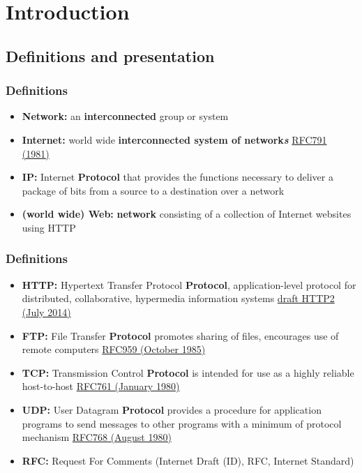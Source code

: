 \section{Introduction}
\subsection{Definitions and presentation}
  \begin{frame}
    \frametitle{Definitions}
      \begin{itemize}
        \item \textbf{Network:} an \textbf{interconnected} group or system\pause
        \item \textbf{Internet:} world wide \textbf{interconnected system of network\emph{s}} \color{blue}\href{http://tools.ietf.org/html/rfc791}{RFC791 (1981)}\color{black}\pause
        \item \textbf{IP:} Internet \textbf{Protocol} that provides the functions necessary to deliver a package of bits from a source to a destination over a network\pause
        \item \textbf{(world wide) Web:} \textbf{network} consisting of a collection of Internet websites using HTTP
      \end{itemize}
  \end{frame}
  \begin{frame}
    \frametitle{Definitions}
      \begin{itemize}
        \item \textbf{HTTP:} Hypertext Transfer Protocol \textbf{Protocol}, application-level protocol for distributed, collaborative, hypermedia information systems \color{blue}\href{http://tools.ietf.org/html/draft-ietf-httpbis-http2-14}{draft HTTP2 (July 2014)} \color{black}\pause
        \item \textbf{FTP:} File Transfer \textbf{Protocol} promotes sharing of files, encourages use of remote computers \color{blue}\href{http://tools.ietf.org/html/rfc959}{RFC959 (October 1985)} \color{black} \pause
        \item \textbf{TCP:} Transmission Control \textbf{Protocol} is intended for use as a highly reliable host-to-host \color{blue}\href{http://tools.ietf.org/html/rfc761}{RFC761 (January 1980)} \color{black} \pause
        \item \textbf{UDP:} User Datagram \textbf{Protocol} provides  a procedure  for application  programs  to send messages  to other programs  with a minimum  of protocol mechanism \color{blue}\href{http://tools.ietf.org/html/rfc768}{RFC768 (August 1980)} \color{black} \pause
        \item \textbf{RFC:} Request For Comments (Internet Draft (ID), RFC, Internet Standard)
      \end{itemize}
  \end{frame}
